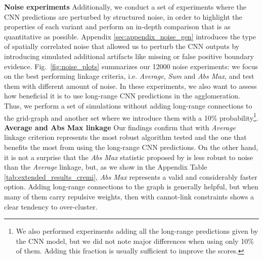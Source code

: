\textbf{Noise experiments }  Additionally, we conduct a set of experiments where the CNN predictions are perturbed by structured noise, in order to highlight the properties of each \algname{} variant and perform an in-depth comparison that is as quantitative as possible. Appendix \ref{sec:appendix_noise_gen} introduces the type of spatially correlated noise that allowed us to perturb the CNN outputs by introducing simulated additional artifacts like missing or false positive boundary evidence. 
Fig.~\ref{fig:noise_plots} summarizes our 12000 noise experiments: we focus on the best performing linkage criteria, i.e. \emph{Average}, \emph{Sum} and \emph{Abs Max}, and test them with different amount of noise. 
In these experiments, we also want to assess how beneficial it is to use long-range CNN predictions in the agglomeration. Thus, we perform a set of simulations without adding long-range connections to the grid-graph and another set where we introduce them with a 10\% probability\footnote{We also performed experiments adding all the long-range predictions given by the CNN model, but we did not note major differences when using only 10\% of them. Adding this fraction is usually sufficient to improve the scores.}.\\

\textbf{Average and Abs Max linkage } Our findings confirm that \algname{} with \emph{Average} linkage criterion represents the most robust algorithm tested and the one that benefits the most from using the long-range CNN predictions. On the other hand, it is not a surprise that the \emph{Abs Max} statistic proposed by \cite{wolf2018mutex} is less robust to noise than the \emph{Average} linkage, but, as we show in the Appendix Table \ref{tab:extended_results_cremi}, \emph{Abs Max} represents a valid and considerably faster option. 
Adding long-range connections to the graph is generally helpful, but when many of them carry repulsive weights, then \algname{} with cannot-link constraints shows a clear tendency to over-cluster. \\

